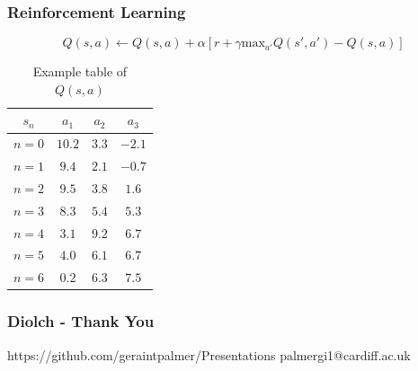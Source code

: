 \documentclass[xcolor={table}]{beamer}
\begin{document}
\begin{frame}
  \frametitle{Reinforcement Learning}

    \begin{equation*}
    Q(s, a) \leftarrow Q(s, a) + \alpha [ r + \gamma \text{max}_{a'} Q(s', a') - Q(s, a)]
    \end{equation*}

  \begin{table}

  \begin{tabular}{ | c | c | c | c | }
  \hline
  $s_n$ & $a_1$ & $a_2$ & $a_3$ \\
  \hline
  $n = 0$ & \cellcolor{green} $10.2$ & $3.3$ & $-2.1$ \\
  $n = 1$ & \cellcolor{green} $9.4$ & $2.1$ & $-0.7$ \\
  $n = 2$ & \cellcolor{green} $9.5$ & $3.8$ & $1.6$ \\
  $n = 3$ & \cellcolor{green} $8.3$ & $5.4$ & $5.3$ \\
  $n = 4$ & $3.1$ & \cellcolor{green} $9.2$ & $6.7$ \\
  $n = 5$ & $4.0$ & $6.1$ & \cellcolor{green} $6.7$ \\
  $n = 6$ & $0.2$ & $6.3$ & \cellcolor{green} $7.5$ \\
  \hline
  \end{tabular}
  \caption{Example table of $Q(s, a)$}
  \end{table}
\end{frame}

\begin{frame}
    \frametitle{Diolch - Thank You}
    https://github.com/geraintpalmer/Presentations
    palmergi1@cardiff.ac.uk
\end{frame}
\end{document}
